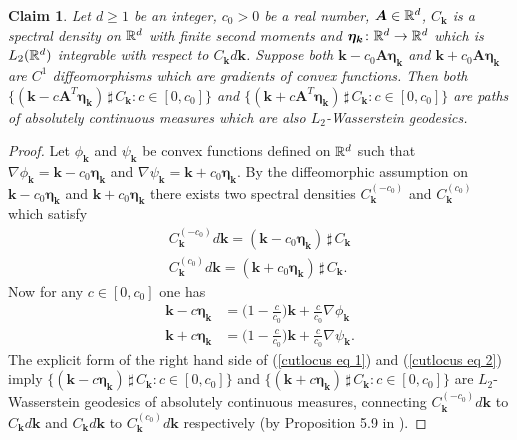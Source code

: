 \documentclass[10pt,noinfoline]{imsart}
\newtheorem{claim}{Claim}
\newcommand{\bs}{\boldsymbol}
\begin{document}
\begin{claim}
\label{claim: cut locus}
Let $d\geq 1$ be an integer, $c_0 > 0$ be a real number, $\bs A\in \Bbb R^d$, $C_{\bs k}$ is a spectral density on $\Bbb R^d$ with finite second moments and $\bs \eta_{\bs k}\colon \Bbb R^d \rightarrow \Bbb R^d$ which is $L_2(\Bbb R^d)$ integrable with respect to $C_{\bs k}d\bs k$.
Suppose both 
$\bs k - c_0\bs A\bs \eta_{\bs k}$ and $\bs k + c_0\bs A\bs \eta_{\bs k}$
are $C^1$ diffeomorphisms which are gradients of convex functions. Then both
$\{(\bs k - c\bs A^T\bs \eta_{\bs k})\,\sharp\,C_{\bs k}\colon c\in[0,c_0]\}$ and $\{(\bs k + c\bs A^T\bs \eta_{\bs k})\,\sharp\,C_{\bs k}\colon c\in[0,c_0]\}$ are paths of absolutely continuous measures which are also $L_2$-Wasserstein geodesics. 
\end{claim}
\begin{proof}
Let $\phi_{\bs k}$ and $\psi_{\bs k}$ be convex functions defined on $\Bbb R^d$ such that $\nabla \phi_{\bs k}=\bs k - c_0\bs \eta_{\bs k}$ and $\nabla \psi_{\bs k}=\bs k + c_0\bs \eta_{\bs k}$. By the diffeomorphic assumption on $\bs k - c_0\bs \eta_{\bs k}$ and $\bs k + c_0\bs \eta_{\bs k}$ there exists two spectral densities $C^{(-c_0)}_{\bs k}$ and $C^{(c_0)}_{\bs k}$ which satisfy 
\begin{align*}
C^{(-c_0)}_{\bs k}d\bs k = (\bs k - c_0\bs \eta_{\bs k})\,\sharp\, C_{\bs k} \\
C^{(c_0)}_{\bs k}d\bs k  = (\bs k + c_0\bs \eta_{\bs k})\,\sharp\, C_{\bs k} .
\end{align*} 
Now for any $c\in[0,c_0]$ one has
\begin{align}
\bs k - c\bs\eta_{\bs k} &= \big(1-\textstyle\frac{c}{c_0}\big)\bs k + \textstyle\frac{c}{c_0}\nabla\phi_{\bs k}\label{cutlocus eq 1} \\
\bs k + c\bs\eta_{\bs k} &= \big(1-\textstyle\frac{c}{c_0}\big)\bs k + \textstyle\frac{c}{c_0}\nabla\psi_{\bs k}\label{cutlocus eq 2}.
\end{align} 
The explicit form of the right hand side of (\ref{cutlocus eq 1}) and (\ref{cutlocus eq 2}) imply $\{ (\bs k - c\bs \eta_{\bs k})\,\sharp\, C_{\bs k} :c\in[0,c_0]\}$  and  $\{ (\bs k + c\bs \eta_{\bs k})\,\sharp\, C_{\bs k} :c\in[0,c_0]\}$  are $L_2$-Wasserstein geodesics of absolutely continuous measures, connecting $C^{(-c_0)}_{\bs k}d\bs k$ to $C_{\bs k}d\bs k $ and  $C_{\bs k}d\bs k$ to $C^{(c_0)}_{\bs k} d\bs k$ respectively (by Proposition 5.9 in \cite{villani2003topics}).
\end{proof}
\end{document}
